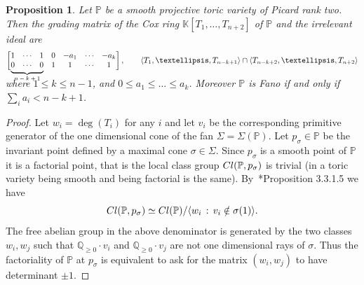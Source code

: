 \documentclass{amsart}
\newcommand\undermat[2]{%
  \makebox[0pt][l]{$\smash{\underbrace{\phantom{%
    \begin{matrix}#2\end{matrix}}}_{\text{$#1$}}}$}#2}
\newtheorem{proposition}[theorem]{Proposition}
\theoremstyle{definition}
\theoremstyle{remark}
\begin{document}
\begin{proposition}
\label{prop:fano}
Let $\mathbb P$ be a smooth projective
toric variety of Picard rank two.
Then the grading matrix of the Cox ring
${\mathbb K}[T_1,\dots,T_{n+2}]$ of $\mathbb P$
and the irrelevant ideal are
\[
 \begin{bmatrix}
  1 & \cdots & 1 & 0 & -a_1 & \cdots & -a_k\\
  \undermat{n-k+1}{0 & \cdots & 0} & 1 & 1 & \cdots & 1
 \end{bmatrix},
 \qquad
 \langle T_1,\dots,T_{n-k+1}\rangle
 \cap
 \langle T_{n-k+2},\dots,T_{n+2}\rangle\\[10pt]
\]
where $1\leq k\leq n-1$,
and $0\leq a_1\leq\dots\leq a_k$.
Moreover $\mathbb P$ is Fano if and only if
$\sum_ia_i < n-k+1$.
\end{proposition}
\begin{proof}
Let $w_i = \deg(T_i)$ for any $i$
and let $v_i$
be the corresponding primitive
generator of the one dimensional
cone of the fan $\Sigma =\Sigma(\mathbb P)$.
Let $p_\sigma\in \mathbb P$
be the invariant point defined by
a maximal cone $\sigma\in\Sigma$.
Since $p_\sigma$ is a smooth point of
$\mathbb P$ it is a factorial point, that is the
local class group ${\rm Cl}(\mathbb P,p_\sigma)$ is
trivial (in a toric variety being smooth
and being factorial is the same).
By~\cite{adhl}*{Proposition 3.3.1.5}
we have
\[
 {\rm Cl}(\mathbb P,p_\sigma)\simeq
 {\rm Cl}(\mathbb P)/\langle w_i\, :\, v_i\notin\sigma(1)\rangle.
\]
The free abelian group in the above denominator
is generated by the two classes $w_i,w_j$
such that ${\mathbb Q}_{\geq 0}\cdot v_i$ and
${\mathbb Q}_{\geq 0}\cdot v_j$ are not one
dimensional rays of $\sigma$.
Thus the factoriality of $\mathbb P$ at $p_\sigma$
is equivalent to ask for the matrix $(w_i,w_j)$
to have determinant $\pm 1$.


\end{proof}
\end{document}
